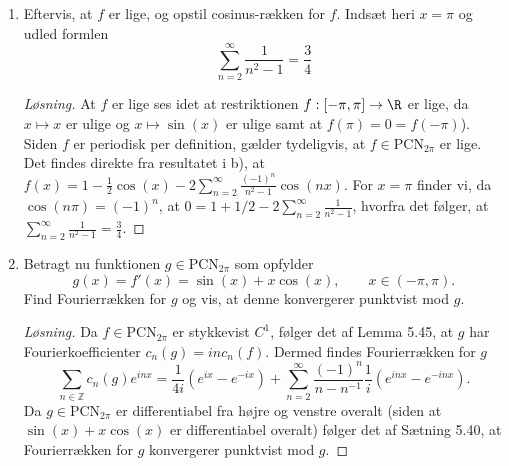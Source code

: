 \begin{opg}
\begin{enumerate}
\begin{proof}[Løsning]
			Det følger da direkte af sætning 5.46, at Fourierrækken konvergerer uniformt mod $ f $.
		\end{proof}
		\fi
		\item Eftervis, at $f$ er lige, og opstil cosinus-rækken for $ f $. Indsæt heri $ x=\pi $ og udled formlen
		$$
		\sum_{n=2}^\infty \frac1{n^2-1}=\frac 34
		$$
		\ifanswers
		\begin{proof}[Løsning]
			At $ f $ er lige ses idet at restriktionen $ f:[-\pi,\pi]\to\R $ er lige, da $ x\mapsto x $ er ulige og $ x\mapsto\sin(x) $ er ulige samt at $ f(\pi)=0=f(-\pi) $).  Siden $ f $ er periodisk per definition, gælder tydeligvis, at $ f\in \text{PCN}_{2\pi} $ er lige. Det findes direkte fra resultatet i b), at $ f(x)=1-\frac{1}{2}\cos(x)-2\sum_{n=2}^{\infty}\frac{(-1)^n}{n^2-1}\cos(nx) $. For $ x=\pi $ finder vi, da $ \cos(n\pi)=(-1)^n $, at $ 0=1+1/2-2\sum_{n=2}^{\infty}\frac{1}{n^2-1} $, hvorfra det følger, at $ \sum_{n=2}^{\infty}\frac{1}{n^2-1}=\frac{3}{4} $.
		\end{proof}
		\fi
		\item Betragt nu funktionen $g\in\text{PCN}_{2\pi}$ som opfylder
		\[
		g(x)=f'(x)=\sin(x)+x\cos(x), \qquad x\in(-\pi,\pi).
		\]
		Find Fourierrækken for $g$
		og vis, at denne konvergerer punktvist mod $ g $. %
		\ifanswers
		\begin{proof}[Løsning]
		Da $ f\in \text{PCN}_{2\pi} $ er stykkevist $ C^1 $, følger det af Lemma 5.45, at $ g $ har Fourierkoefficienter $ c_n(g)=inc_n(f) $. Dermed findes Fourierrækken for $ g $ $$
		\sum_{n\in \mathbb{Z}}c_n(g)e^{inx}=\frac{1}{4i}(e^{ix}-e^{-ix})+\sum_{n=2}^{\infty}\frac{(-1)^n}{n-n^{-1}}\frac{1}{i}\left(e^{inx}-e^{-inx}\right).
		$$ 	
		Da $ g\in \text{PCN}_{2\pi} $ er differentiabel fra højre og venstre overalt (siden at $ \sin(x)+x\cos(x) $ er differentiabel overalt) følger det af Sætning 5.40, at Fourierrækken for $ g $ konvergerer punktvist mod $ g $.
		\end{proof}
		\fi
	\end{enumerate}
\end{opg}


